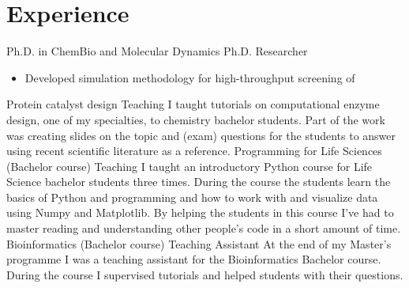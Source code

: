 \documentclass[letterpaper]{twentysecondcv} %
\begin{document}
\section{Experience}

\begin{twenty} %
		{Ph.D. {\normalfont in ChemBio and Molecular Dynamics}}
		{Ph.D. Researcher}
		{
		\begin{itemize}
			\item Developed simulation methodology for high-throughput screening of 
		\end{itemize}
		}
		{Protein catalyst design}
		{Teaching}
		{I taught tutorials on computational enzyme design, one of my specialties, to chemistry bachelor students. Part of the work was creating slides on the topic and (exam) questions for the students to answer using recent scientific literature as a reference.}
		{Programming for Life Sciences (Bachelor course)}
		{Teaching}
		{I taught an introductory Python course for Life Science bachelor students three times. During the course the students learn the basics of Python and programming and how to work with and visualize data using Numpy and Matplotlib. By helping the students in this course I've had to master reading and understanding other people's code in a short amount of time.}
		{Bioinformatics (Bachelor course)}
		{Teaching Assistant}
		{At the end of my Master's programme I was a teaching assistant for the Bioinformatics Bachelor course. During the course I supervised tutorials and helped students with their questions.}
\end{twenty}

\end{document}
